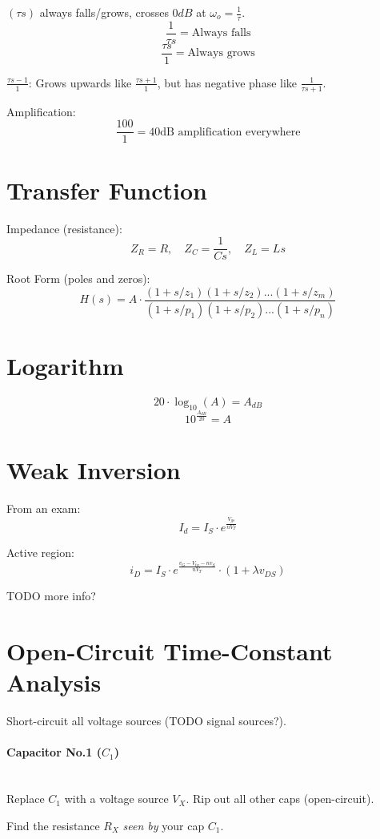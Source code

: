 \documentclass[twocolumn]{article}
\begin{document}
    $(\tau s)$ always falls/grows, crosses $0dB$ at $\omega_o = \frac{1}{\tau}$.
    $$\frac{1}{\tau s} = \text{Always falls}$$
    $$\frac{\tau s}{1} = \text{Always grows}$$

    $\frac{\tau s - 1}{1}$:
    Grows upwards like $\frac{\tau s + 1}{1}$, but has negative phase like
    $\frac{1}{\tau s + 1}$.

    Amplification:
    $$\frac{100}{1} = \text{40dB amplification everywhere}$$

  \section{Transfer Function}
    Impedance (resistance):
    $$Z_R = R
      ,\quad Z_C = \frac{1}{Cs}
      ,\quad Z_L = Ls
      $$

    Root Form (poles and zeros):
      $$H(s) = A \cdot \frac{(1 + s/z_1)(1 + s/z_2)...(1 + s/z_m)}
                            {(1 + s/p_1)(1 + s/p_2)...(1 + s/p_n)}$$

  \section{Logarithm}
    $$20 \cdot \log_{10}(A) = A_{dB}$$
    $$10^{\frac{A_{dB}}{20}} = A$$

  \section{Weak Inversion}
    From an exam:
    $$I_d = I_S \cdot e^{\frac{V_{gs}}{n V_T}}$$

    Active region:
    $$i_D = I_S \cdot e^{\frac{v_G - V_{tn} - n v_S}{nV_T}}
            \cdot (1 + \lambda v_{DS})$$

    TODO more info?

  \section{Open-Circuit Time-Constant Analysis}
    Short-circuit all voltage sources (TODO signal sources?).

    \paragraph{Capacitor No.1 ($C_1$)} \hfill \\
      Replace $C_1$ with a voltage source $V_X$.
      Rip out all other caps (open-circuit).
  
      Find the resistance $R_X$ \emph{seen by} your cap $C_1$.
  
\end{document}

